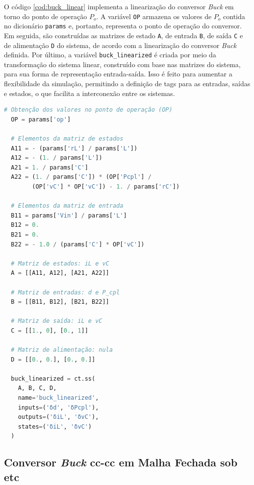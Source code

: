 O código \ref{cod:buck_linear} implementa a linearização do conversor \textit{Buck} em torno do ponto de operação $P_o$. A variável \texttt{OP} armazena os valores de $P_o$ contida no dicionário \texttt{params} e, portanto, representa o ponto de operação do conversor. Em seguida, são construídas as matrizes de estado \texttt{A}, de entrada \texttt{B}, de saída \texttt{C} e de alimentação \texttt{D} do sistema, de acordo com a linearização do conversor \textit{Buck} definida. Por último, a variável \texttt{buck\_linearized} é criada por meio da transformação do sistema linear, construído com base nas matrizes do sistema, para sua forma de representação entrada-saída. Isso é feito para aumentar a flexibilidade da simulação, permitindo a definição de tags para as entradas, saídas e estados, o que facilita a interconexão entre os sistemas.

\vspace{8pt}
\begin{lstlisting}[language=Python, caption={Implementação do conversor \textit{Buck} linearizado.}, label=cod:buck_linear]
  # Obtenção dos valores no ponto de operação (OP)
  OP = params['op']

  # Elementos da matriz de estados
  A11 = - (params['rL'] / params['L'])
  A12 = - (1. / params['L'])
  A21 = 1. / params['C']
  A22 = (1. / params['C']) * (OP['Pcpl'] /
        (OP['vC'] * OP['vC']) - 1. / params['rC'])

  # Elementos da matriz de entrada
  B11 = params['Vin'] / params['L']
  B12 = 0.
  B21 = 0.
  B22 = - 1.0 / (params['C'] * OP['vC'])

  # Matriz de estados: iL e vC
  A = [[A11, A12], [A21, A22]]

  # Matriz de entradas: d e P_cpl
  B = [[B11, B12], [B21, B22]]

  # Matriz de saída: iL e vC
  C = [[1., 0], [0., 1]]

  # Matriz de alimentação: nula
  D = [[0., 0.], [0., 0.]]

  buck_linearized = ct.ss(
    A, B, C, D,
    name='buck_linearized',
    inputs=('δd', 'δPcpl'),
    outputs=('δiL', 'δvC'),
    states=('δiL', 'δvC')
  )
\end{lstlisting}

\subsection{Conversor \textit{Buck} \acrshort{cc}-\acrshort{cc} em Malha Fechada sob \acrshort{etc}}

